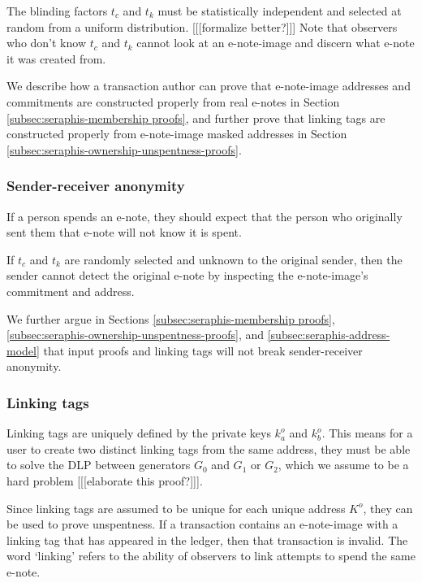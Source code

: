 The blinding factors $t_c$ and $t_k$ must be statistically independent and selected at random from a uniform distribution. [[[formalize better?]]] Note that observers who don't know $t_c$ and $t_k$ cannot look at an e-note-image and discern what e-note it was created from.

We describe how a transaction author can prove that e-note-image addresses and commitments are constructed properly from real e-notes in Section \ref{subsec:seraphis-membership proofs}, and further prove that linking tags are constructed properly from e-note-image masked addresses in Section \ref{subsec:seraphis-ownership-unspentness-proofs}.

\subsubsection{Sender-receiver anonymity}
\label{subsubsec:e-note-images-sender-receiver-anonymity}

If a person spends an e-note, they should expect that the person who originally sent them that e-note will not know it is spent.

If $t_c$ and $t_k$ are randomly selected and unknown to the original sender, then the sender cannot detect the original e-note by inspecting the e-note-image's commitment and address.

We further argue in Sections \ref{subsec:seraphis-membership proofs}, \ref{subsec:seraphis-ownership-unspentness-proofs}, and \ref{subsec:seraphis-address-model} that input proofs and linking tags will not break sender-receiver anonymity.

\subsubsection{Linking tags}
\label{subsubsec:e-note-images-linking-tags}

Linking tags are uniquely defined by the private keys $k^o_a$ and $k^o_b$. This means for a user to create two distinct linking tags from the same address, they must be able to solve the DLP between generators $G_0$ and $G_1$ or $G_2$, which we assume to be a hard problem [[[elaborate this proof?]]].

Since linking tags are assumed to be unique for each unique address $K^o$, they can be used to prove unspentness. If a transaction contains an e-note-image with a linking tag that has appeared in the ledger, then that transaction is invalid. The word `linking' refers to the ability of observers to link attempts to spend the same e-note.

